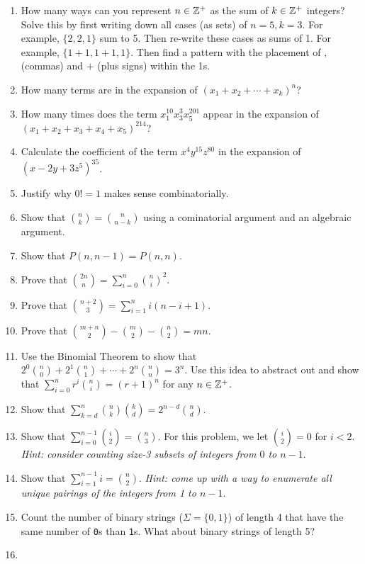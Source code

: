 \documentclass[main.tex]{subfiles}
\begin{document}
\begin{enumerate}
	\item How many ways can you represent \(n \in \mathbb{Z}^+\) as the sum of \(k \in \mathbb{Z}^+\) integers? Solve this by first writing down all cases (as sets) of \(n=5,k=3\). For example, \(\{2,2,1\}\) sum to 5. Then re-write these cases as sums of 1. For example, \(\{1+1,1+1,1\}\). Then find a pattern with the placement of \(,\) (commas) and \(+\) (plus signs) within the 1s.
	\item
	How many terms are in the expansion of \((x_1+x_2+\cdots+x_k)^n\)?
	\item
	How many times does the term \(x_1^{10} x_3^3 x_5^{201}\) appear in the expansion of \((x_1 + x_2 + x_3 + x_4 + x_5)^{214}\)?
	\item
	Calculate the coefficient of the term \(x^4 y^{15} z^{80}\) in the expansion of \((x -2y + 3z^5)^{35}\).
	\item
	Justify why \(0! = 1\) makes sense combinatorially.
	\item
	Show that \(\binom{n}{k} =  \binom{n}{n-k}\) using a cominatorial argument and an algebraic argument.
	\item
	Show that \(P(n,n-1) = P(n,n)\).
	\item Prove that \(\binom{2n}{n} = \sum_{i=0}^{n} \binom{n}{i}^2\).
	\item Prove that \(\binom{n+2}{3} = \sum_{i=1}^{n} i(n-i+1)\).
	\item Prove that \(\binom{m+n}{2} - \binom{m}{2} - \binom{n}{2} = mn\).
	\item Use the Binomial Theorem to show that \(2^0\binom{n}{0} + 2^1\binom{n}{1} + \cdots + 2^n\binom{n}{n} = 3^n\).
	Use this idea to abstract out and show that \(\sum_{i=0}^{n} r^i \binom{n}{i} = (r+1)^n\) for any \(n \in \mathbb{Z}^+\).
	\item
	Show that \(\sum_{k=d}^{n} \binom{n}{k}\binom{k}{d} = 2^{n-d}\binom{n}{d}\).
	\item
	Show that \(\sum_{i=0}^{n-1} \binom{i}{2} = \binom{n}{3}\).
	For this problem, we let \(\binom{i}{2} = 0\) for \(i < 2\).
	\textit{Hint: consider counting size-3 subsets of integers from \(0\) to \(n-1\)}.
	\item
	Show that \(\sum_{i=1}^{n-1} i = \binom{n}{2}\).
	\textit{Hint: come up with a way to enumerate all unique pairings of the integers from 1 to \(n-1\)}.
	\item
	Count the number of binary strings (\(\Sigma = \{0,1\}\)) of length 4 that have the same number of \texttt{0}s than \texttt{1}s.
	What about binary strings of length 5?
	\item

\end{enumerate}
\end{document}
